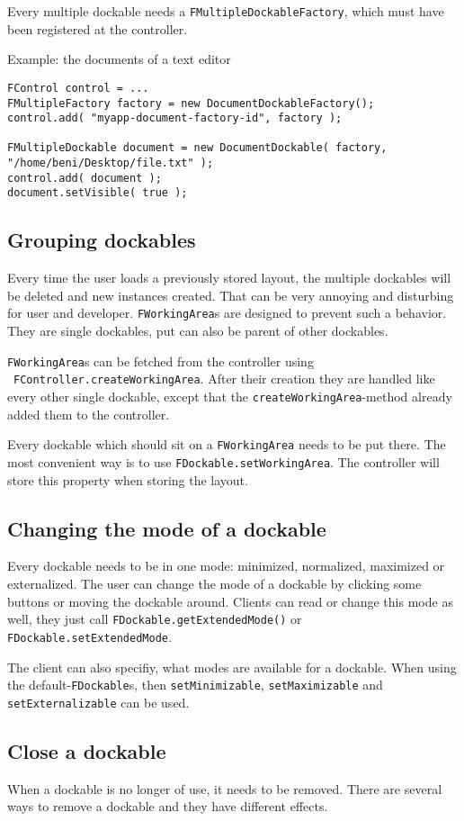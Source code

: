 \documentclass[a4paper,10pt]{article}
\newcommand{\src}[1]{\lstinline[basicstyle=\ttfamily]|#1|}
\begin{document}
Every multiple dockable needs a \src{FMultipleDockableFactory}, which must have been registered at the controller.

Example: the documents of a text editor
\begin{lstlisting}
FControl control = ...
FMultipleFactory factory = new DocumentDockableFactory();
control.add( "myapp-document-factory-id", factory );

FMultipleDockable document = new DocumentDockable( factory, "/home/beni/Desktop/file.txt" );
control.add( document );
document.setVisible( true );
\end{lstlisting}

\subsection{Grouping dockables}
Every time the user loads a previously stored layout, the multiple dockables will be deleted and new instances created. That can be very annoying and disturbing for user and developer. \src{FWorkingArea}s are designed to prevent such a behavior. They are single dockables, put can also be parent of other dockables.

\src{FWorkingArea}s can be fetched from the controller using \ \src{FController.createWorkingArea}. After their creation they are handled like every other single dockable, except that the \src{createWorkingArea}-method already added them to the controller.

Every dockable which should sit on a \src{FWorkingArea} needs to be put there. The most convenient way is to use \src{FDockable.setWorkingArea}. The controller will store this property when storing the layout.

\subsection{Changing the mode of a dockable}
Every dockable needs to be in one mode: minimized, normalized, maximized or externalized. The user can change the mode of a dockable by clicking some buttons or moving the dockable around. Clients can read or change this mode as well, they just call \src{FDockable.getExtendedMode()} or \src{FDockable.setExtendedMode}.

The client can also specifiy, what modes are available for a dockable. When using the default-\src{FDockable}s, then \src{setMinimizable}, \src{setMaximizable} and \src{setExternalizable} can be used.

\subsection{Close a dockable}
When a dockable is no longer of use, it needs to be removed. There are several ways to remove a dockable and they have different effects.
\end{document}
